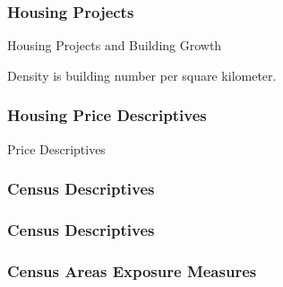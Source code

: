 \documentclass[aspectratio=149]{beamer}
\begin{document}

\begin{frame}
\frametitle{Housing Projects}
\begin{table}
\caption{Housing Projects and Building Growth}

\end{table}
\vspace{.2cm} 
Density is building number per square kilometer.
\end{frame}


\begin{frame}
\frametitle{Housing Price Descriptives}
\begin{table}
\caption{Price Descriptives}
\centering
\resizebox{.95\textwidth}{!}{  

}
\end{table}
\end{frame}


\begin{frame}
\frametitle{Census Descriptives}

\centering
\resizebox{\textwidth}{!}{  

}

\end{frame}



\begin{frame}
\frametitle{Census Descriptives}

\centering
\resizebox{\textwidth}{!}{  

}

\end{frame}


\begin{frame}
\frametitle{Census Areas Exposure Measures}
\begin{center}
\begin{figure}
\vspace{-3mm}
\end{figure}
\end{center}
\end{frame}
\end{document}
